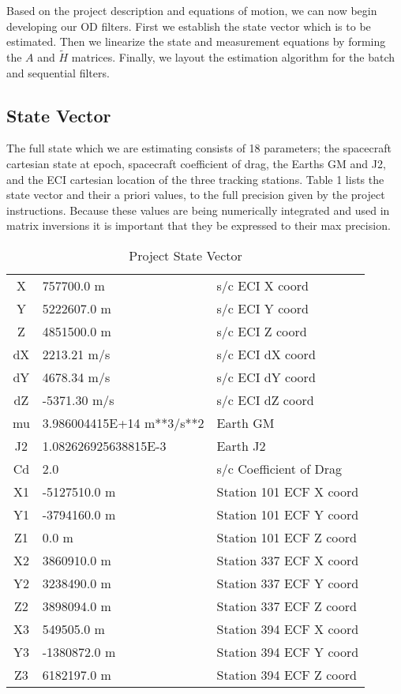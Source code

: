 \documentclass[10pt]{article}
\begin{document}
Based on the project description and equations of motion, we can now begin developing our OD filters. First we establish the state vector which is to be estimated. Then we linearize the state and measurement equations by forming the $A$ and $\tilde{H}$ matrices. Finally, we layout the estimation algorithm for the batch and sequential filters. 

\subsection{State Vector}

The full state which we are estimating consists of 18 parameters; the spacecraft cartesian state at epoch, spacecraft coefficient of drag, the Earths GM and J2, and the ECI cartesian location of the three tracking stations. Table 1 lists the state vector and their a priori values, to the full precision given by the project instructions. Because these values are being numerically integrated and used in matrix inversions it is important that they be expressed to their max precision.

\begin{table}[htdp]
\caption{Project State Vector}
\begin{center}
\begin{tabular}{|c|l|l|}
\hline\hline
X & 757700.0 m & s/c ECI X coord \\
Y & 5222607.0 m & s/c ECI Y coord \\
Z & 4851500.0 m & s/c ECI Z coord \\
dX & 2213.21 m/s & s/c ECI dX coord \\
dY & 4678.34 m/s & s/c ECI dY coord \\
dZ & -5371.30 m/s & s/c ECI dZ coord \\
mu & 3.986004415E+14 m**3/s**2 & Earth GM \\
J2 & 1.082626925638815E-3 & Earth J2 \\
Cd & 2.0 & s/c Coefficient of Drag \\
X1 & -5127510.0 m & Station 101 ECF X coord \\
Y1 & -3794160.0 m & Station 101 ECF Y coord \\
Z1 & 0.0 m & Station 101 ECF Z coord \\
X2 & 3860910.0 m & Station 337 ECF X coord \\
Y2 & 3238490.0 m & Station 337 ECF Y coord \\
Z2 & 3898094.0 m & Station 337 ECF Z coord \\
X3 & 549505.0  m & Station 394 ECF X coord \\
Y3 & -1380872.0 m & Station 394 ECF Y coord \\
Z3 & 6182197.0 m & Station 394 ECF Z coord \\
\hline\hline
\end{tabular}
\end{center}
\label{default}
\end{table}%
\end{document}

